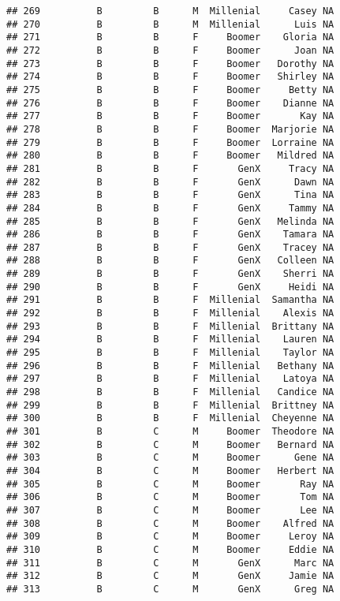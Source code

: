 \documentclass[
]{article}
\begin{document}
\begin{verbatim}
## 269          B         B      M  Millenial     Casey NA
## 270          B         B      M  Millenial      Luis NA
## 271          B         B      F     Boomer    Gloria NA
## 272          B         B      F     Boomer      Joan NA
## 273          B         B      F     Boomer   Dorothy NA
## 274          B         B      F     Boomer   Shirley NA
## 275          B         B      F     Boomer     Betty NA
## 276          B         B      F     Boomer    Dianne NA
## 277          B         B      F     Boomer       Kay NA
## 278          B         B      F     Boomer  Marjorie NA
## 279          B         B      F     Boomer  Lorraine NA
## 280          B         B      F     Boomer   Mildred NA
## 281          B         B      F       GenX     Tracy NA
## 282          B         B      F       GenX      Dawn NA
## 283          B         B      F       GenX      Tina NA
## 284          B         B      F       GenX     Tammy NA
## 285          B         B      F       GenX   Melinda NA
## 286          B         B      F       GenX    Tamara NA
## 287          B         B      F       GenX    Tracey NA
## 288          B         B      F       GenX   Colleen NA
## 289          B         B      F       GenX    Sherri NA
## 290          B         B      F       GenX     Heidi NA
## 291          B         B      F  Millenial  Samantha NA
## 292          B         B      F  Millenial    Alexis NA
## 293          B         B      F  Millenial  Brittany NA
## 294          B         B      F  Millenial    Lauren NA
## 295          B         B      F  Millenial    Taylor NA
## 296          B         B      F  Millenial   Bethany NA
## 297          B         B      F  Millenial    Latoya NA
## 298          B         B      F  Millenial   Candice NA
## 299          B         B      F  Millenial  Brittney NA
## 300          B         B      F  Millenial  Cheyenne NA
## 301          B         C      M     Boomer  Theodore NA
## 302          B         C      M     Boomer   Bernard NA
## 303          B         C      M     Boomer      Gene NA
## 304          B         C      M     Boomer   Herbert NA
## 305          B         C      M     Boomer       Ray NA
## 306          B         C      M     Boomer       Tom NA
## 307          B         C      M     Boomer       Lee NA
## 308          B         C      M     Boomer    Alfred NA
## 309          B         C      M     Boomer     Leroy NA
## 310          B         C      M     Boomer     Eddie NA
## 311          B         C      M       GenX      Marc NA
## 312          B         C      M       GenX     Jamie NA
## 313          B         C      M       GenX      Greg NA

\end{verbatim}
\end{document}
